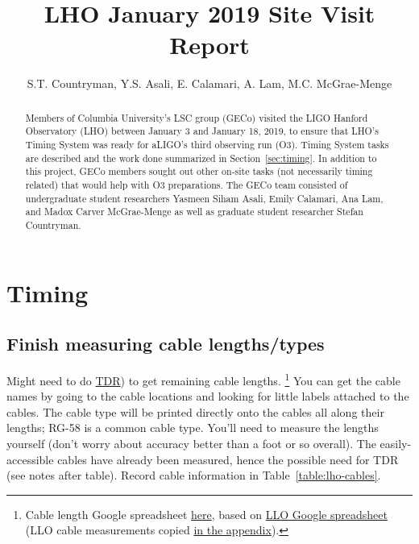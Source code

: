 \documentclass{article}
\author{S.T. Countryman,
Y.S. Asali,
E. Calamari,
A. Lam,
M.C. McGrae-Menge
}
\title{LHO January 2019 Site Visit Report}
\newcommand*{\TODO}{\textcolor{todo}}
\begin{document}
\maketitle

\begin{abstract}
    Members of Columbia University's LSC group (GECo) visited the LIGO Hanford Observatory (LHO) between January 3 and January 18, 2019, to ensure that LHO's Timing System was ready for aLIGO's third observing run (O3). Timing System tasks are described and the work done summarized in Section~\ref{sec:timing}. In addition to this project, GECo members sought out other on-site tasks (not necessarily timing related) that would help with O3 preparations. The GECo team consisted of undergraduate student researchers Yasmeen Siham Asali, Emily Calamari, Ana Lam, and Madox Carver McGrae-Menge as well as graduate student researcher Stefan Countryman.
\end{abstract}

\section{\label{sec:timing}Timing}

\subsection{\label{sec:cable-lengths}Finish measuring cable lengths/types}

Might need to do 
\href{https://en.wikipedia.org/wiki/Time-domain_reflectometer}{TDR})
to get remaining cable lengths.
\footnote{
    Cable length Google spreadsheet \href{https://docs.google.com/spreadsheets/d/1cjpBtpd4oPAfjNjBhE3RXxSx3ma3oopqLLZFMjEjc0w/edit\#gid=0}{here}, based on \href{https://docs.google.com/spreadsheets/d/1AfZ9m7Qetefmtr-PnHNARC14OWaPfn0z5c9GOvcojyA/edit\#gid=0}{LLO Google spreadsheet} (LLO cable measurements copied \hyperref[sec:llocables]{in the appendix}).
}
You can get the cable names by going to the cable locations and looking for little labels attached to the cables. The cable type will be printed directly onto the cables all along their lengths; RG-58 is a common cable type. You'll need to measure the lengths yourself (don't worry about accuracy better than a foot or so overall). The easily-accessible cables have already been measured, hence the possible need for TDR (see notes after table).
Record cable information in Table~\ref{table:lho-cables}.
\end{document}

